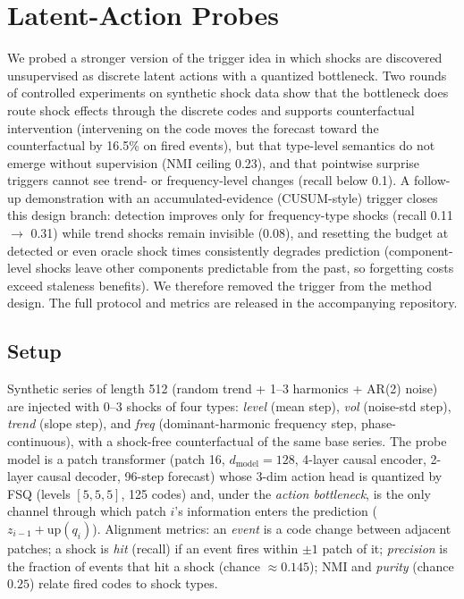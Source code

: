 \section{Latent-Action Probes}
\label{app:action}
We probed a stronger version of the trigger idea in which shocks are discovered unsupervised as discrete latent actions with a quantized bottleneck. Two rounds of controlled experiments on synthetic shock data show that the bottleneck does route shock effects through the discrete codes and supports counterfactual intervention (intervening on the code moves the forecast toward the counterfactual by 16.5\% on fired events), but that type-level semantics do not emerge without supervision (NMI ceiling 0.23), and that pointwise surprise triggers cannot see trend- or frequency-level changes (recall below 0.1). A follow-up demonstration with an accumulated-evidence (CUSUM-style) trigger closes this design branch: detection improves only for frequency-type shocks (recall 0.11 $\to$ 0.31) while trend shocks remain invisible (0.08), and resetting the budget at detected or even oracle shock times consistently degrades prediction (component-level shocks leave other components predictable from the past, so forgetting costs exceed staleness benefits). We therefore removed the trigger from the method design. The full protocol and metrics are released in the accompanying repository.

\subsection{Setup}

Synthetic series of length 512 (random trend + 1--3 harmonics + AR(2) noise) are injected with 0--3 shocks of four types: \emph{level} (mean step), \emph{vol} (noise-std step), \emph{trend} (slope step), and \emph{freq} (dominant-harmonic frequency step, phase-continuous), with a shock-free counterfactual of the same base series. The probe model is a patch transformer (patch 16, $d_{\mathrm{model}}{=}128$, 4-layer causal encoder, 2-layer causal decoder, 96-step forecast) whose 3-dim action head is quantized by FSQ (levels $[5,5,5]$, 125 codes) and, under the \emph{action bottleneck}, is the only channel through which patch $i$'s information enters the prediction ($z_{i-1} + \mathrm{up}(q_i)$). Alignment metrics: an \emph{event} is a code change between adjacent patches; a shock is \emph{hit} (recall) if an event fires within $\pm 1$ patch of it; \emph{precision} is the fraction of events that hit a shock (chance $\approx 0.145$); NMI and \emph{purity} (chance $0.25$) relate fired codes to shock types.


